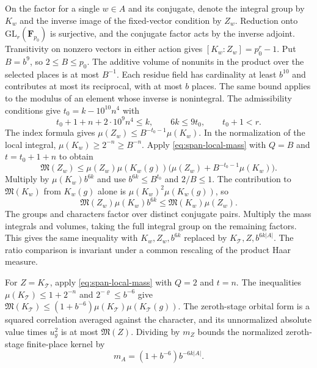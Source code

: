 On the factor for a single \(w\in A\) and its conjugate, denote the
integral group by \(K_w\) and the inverse image of the fixed-vector
condition by \(Z_w\). Reduction onto \(\mathrm{GL}_r(\mathbf F_{p_0})\) is
surjective, and the conjugate factor acts by the inverse adjoint.
Transitivity on nonzero vectors in either action gives
\([K_w:Z_w]=p_0^r-1\). Put \(B=b^9\), so \(2\le B\le p_0\).
The additive volume of nonunits in the product over the selected places
is at most \(B^{-1}\). Each residue field has cardinality at least
\(b^{10}\) and contributes at most its reciprocal, with at most \(b\) places.
The same bound applies to the modulus of an element whose inverse is nonintegral.
The admissibility conditions give \(t_0=k-10^{10}n^4\) with
\[
 t_0+1+n+2\cdot10^9n^4\le k,\qquad
 6k\le9t_0,\qquad t_0+1<r.
\]
The index formula gives \(\mu(Z_w)\le B^{-t_0-1}\mu(K_w)\).
In the normalization of the local integral,
\(\mu(K_w)\ge2^{-n}\ge B^{-n}\). Apply \eqref{eq:span-local-mass} with
\(Q=B\) and \(t=t_0+1+n\) to obtain
\[
 \mathfrak M(Z_w)\le
 \mu(Z_w)\mu(K_w(g))
       \bigl(\mu(Z_w)+B^{-t_0-1}\mu(K_w)\bigr).
\]
Multiply by \(\mu(K_w)b^{6k}\) and use \(b^{6k}\le B^{t_0}\) and \(2/B\le1\).
The contribution to \(\mathfrak M(K_w)\) from \(K_w(g)\) alone is
\(\mu(K_w)^2\mu(K_w(g))\), so
\[
 \mathfrak M(Z_w)\mu(K_w)b^{6k}
 \le\mathfrak M(K_w)\mu(Z_w).
\]
The groups and characters factor over distinct conjugate pairs. Multiply
the mass integrals and volumes, taking the full integral group on the
remaining factors. This gives the same inequality with
\(K_w,Z_w,b^{6k}\) replaced by \(K_{\mathcal T},Z,b^{6k|A|}\).
The ratio comparison is invariant under a common rescaling of the
product Haar measure.

For \(Z=K_{\mathcal T}\), apply \eqref{eq:span-local-mass} with \(Q=2\)
and \(t=n\). The inequalities \(\mu(K_{\mathcal T})\le1+2^{-n}\) and
\(2^{-\varrho}\le b^{-6}\) give
\(\mathfrak M(K_{\mathcal T})\le(1+b^{-6})\mu(K_{\mathcal T})\mu(K_{\mathcal T}(g))\).
The zeroth-stage orbital form is a squared correlation averaged against
the character, and its unnormalized absolute value times \(u_g^2\) is
at most \(\mathfrak M(Z)\). Dividing by \(m_Z\) bounds the normalized
zeroth-stage finite-place kernel by
\begin{equation}\label{eq:span-local-zero}
 m_A=(1+b^{-6})b^{-6k|A|}.
\end{equation}

